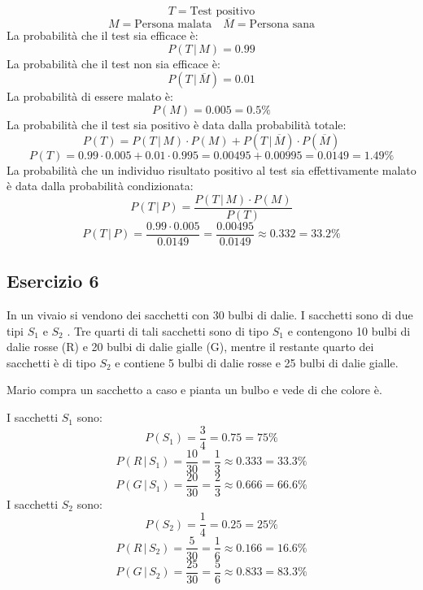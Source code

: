 \documentclass[a4paper]{article}
\theoremstyle{break}
\theoremstyle{break}
\theoremstyle{break}
\theoremstyle{break}
\begin{document}
\vspace{1em}
\[
	T = \text{Test positivo}
\]
\[
	M = \text{Persona malata} \quad \overline{M} = \text{Persona sana}
\]
La probabilità che il test sia efficace è:
\[
	P(T\,|\,M) = 0.99
\]
La probabilità che il test non sia efficace è:
\[
	P(T\,|\,\overline{M}) = 0.01
\]
La probabilità di essere malato è:
\[
	P(M) = 0.005 = 0.5\%
\]
La probabilità che il test sia positivo è data dalla probabilità totale:
\[
	P(T) = P(T\,|\,M) \cdot P(M) + P(T\,|\,\overline{M}) \cdot P(\overline{M})
\]
\[
	P(T) = 0.99 \cdot 0.005 + 0.01 \cdot 0.995 = 0.00495 + 0.00995 = 0.0149 = 1.49\%
\]
La probabilità che un individuo risultato positivo al test sia effettivamente malato è
data dalla probabilità condizionata:
\[
	P(T\,|\,P) = \frac{P(T\,|\,M) \cdot P(M)}{P(T)}
\]
\[
	P(T\,|\,P) = \frac{0.99 \cdot 0.005}{0.0149} = \frac{0.00495}{0.0149} \approx
	0.332 = 33.2\%
\]

\subsection{Esercizio 6}
In un vivaio si vendono dei sacchetti con 30 bulbi di dalie. I sacchetti sono
di due tipi \( S_1 \)  e \( S_2 \) . Tre quarti di tali sacchetti sono di tipo \( S_1 \) e contengono
10 bulbi di dalie rosse (R) e 20 bulbi di dalie gialle (G), mentre il restante
quarto dei sacchetti è di tipo \( S_2 \) e contiene 5 bulbi di dalie rosse e 25 bulbi di
dalie gialle.

\noindent Mario compra un sacchetto a caso e pianta un bulbo e vede di
che colore è.

\vspace{1em}
\noindent I sacchetti \( S_1 \)  sono:
\[
	P(S_1) = \frac{3}{4} = 0.75 = 75\%
\]
\[
	P(R\,|\,S_1) = \frac{10}{30} = \frac{1}{3} \approx 0.333 = 33.3\%
\]
\[
	P(G\,|\,S_1) = \frac{20}{30} = \frac{2}{3} \approx 0.666 = 66.6\%
\]
I sacchetti \( S_2 \)  sono:
\[
	P(S_2) = \frac{1}{4} = 0.25 = 25\%
\]
\[
	P(R\,|\,S_2) = \frac{5}{30} = \frac{1}{6} \approx 0.166 = 16.6\%
\]
\[
	P(G\,|\,S_2) = \frac{25}{30} = \frac{5}{6} \approx 0.833 = 83.3\%
\]
\end{document}
